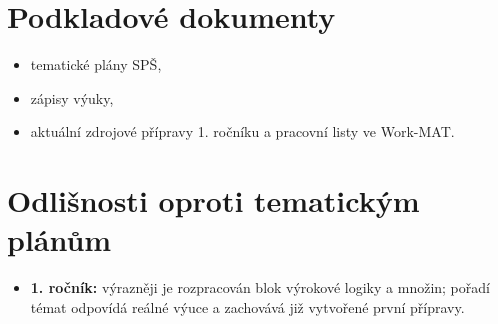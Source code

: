\documentclass[10pt,a4paper]{article}
\begin{document}
\section*{Podkladové dokumenty}
\begin{itemize}\setlength{\itemsep}{2pt}
\item tematické plány SP\v{S},
\item zápisy výuky,
\item aktuální zdrojové přípravy 1. ročníku a pracovní listy ve Work-MAT.
\end{itemize}

\section*{Odlišnosti oproti tematickým plánům}
\begin{itemize}\setlength{\itemsep}{2pt}
\item \textbf{1. ročník:} výrazněji je rozpracován blok výrokové logiky a množin; pořadí témat odpovídá reálné výuce a zachovává již vytvořené první přípravy.
\end{itemize}
\clearpage
\end{document}
